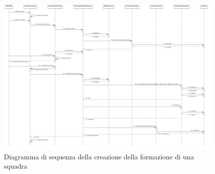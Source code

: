 %
%
\begin{figure}[h]
	\centering
	\includegraphics[width=1\textwidth]
	{immagini/sd-partita}
	
	\caption{Diagramma di sequenza della creazione della formazione di una squadra}
\end{figure}